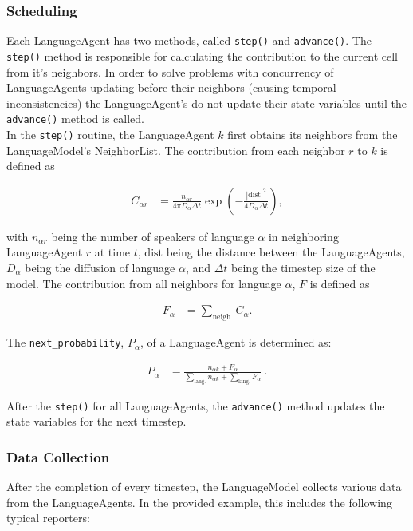 \documentclass{article}
\begin{document}
\subsubsection{Scheduling}
Each LanguageAgent has two methods, called \texttt{step()} and \texttt{advance()}. The \texttt{step()} method is responsible for calculating the contribution to the current cell from it's neighbors. In order to solve problems with concurrency of LanguageAgents updating before their neighbors (causing temporal inconsistencies) the LanguageAgent's do not update their state variables until the \texttt{advance()} method is called.\\
In the \texttt{step()} routine, the LanguageAgent $k$ first obtains its neighbors from the LanguageModel's NeighborList. The contribution from each neighbor $r$ to $k$ is defined as

\begin{align}
	C_{\alpha r} & = \frac{n_{\alpha r}}{4\pi D_\alpha \Delta t} \exp \left( - \frac{|\text{dist}|^2}{4 D_\alpha \Delta t} \right), 
\end{align}

with $n_{\alpha r} $ being the number of speakers of language $\alpha$ in neighboring LanguageAgent $r$ at time $t$, $\text{dist}$ being the distance between the LanguageAgents, $D_\alpha$ being the diffusion of language $\alpha$, and $\Delta t$ being the timestep size of the model. The contribution from all neighbors for language $\alpha$, $F$ is defined as

\begin{align}
	F_\alpha & = \sum_{\text{neigh.}} C_\alpha. 
\end{align}

The \texttt{next\_probability}, $P_\alpha$, of a LanguageAgent is determined as:

\begin{align}
	P_\alpha & = \frac{n_{\alpha k} + F_\alpha}{\sum_{\text{lang.}} n_{\alpha k} + \sum_{\text{lang.}} F_{\alpha} } ~. 
\end{align}

After the \texttt{step()} for all LanguageAgents, the \texttt{advance()} method updates the state variables for the next timestep.

\subsubsection{Data Collection}
After the completion of every timestep, the LanguageModel collects various data from the LanguageAgents. In the provided example, this includes the following typical reporters:
\end{document}
